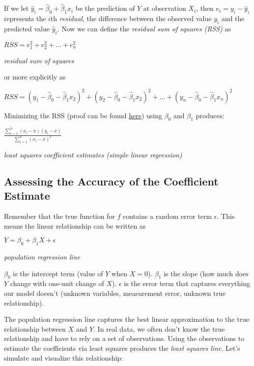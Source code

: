\documentclass[]{book}
\theoremstyle{definition}
\theoremstyle{definition}
\theoremstyle{definition}
\theoremstyle{remark}
\begin{document}
If we let \(\hat y_i = \hat\beta_0 + \hat\beta_1x_i\) be the prediction
of \(Y\) at observation \(X_i\), then \(e_i = y_i - \hat y_i\)
represents the \(i\)th \emph{residual}, the difference between the
observed value \(y_i\) and the predicted value \(\hat y_i\). Now we can
define the \emph{residual sum of squares (RSS)} as

\(RSS = e_1^2 + e_2^2 + ... + e_n^2\)

\emph{residual sum of squares}

or more explicitly as

\(RSS = (y_1 - \hat\beta_0 - \hat\beta_1x_2)^2 + (y_2 - \hat\beta_0 - \hat\beta_1x_2)^2 + ... + (y_n - \hat\beta_0 - \hat\beta_1x_n)^2\)

Minimizing the RSS (proof can be found
\href{https://en.m.wikipedia.org/wiki/Simple_linear_regression\#Derivation_of_simple_regression_estimators}{here})
using \(\beta_0\) and \(\beta_1\) produces:

\(\frac{\displaystyle \sum_{i=1}^{n}(x_i-\bar x)(y_i - \bar x)}{\displaystyle\sum_{i=1}^{n}(x_i - \bar x)^2}\)

\emph{least squares coefficient estimates (simple linear regression)}

\subsection{Assessing the Accuracy of the Coefficient
Estimate}\label{assessing-the-accuracy-of-the-coefficient-estimate}

Remember that the true function for \(f\) contains a random error term
\(\epsilon\). This means the linear relationship can be written as

\(Y = \beta_0 + \beta_1X + \epsilon\)

\emph{population regression line}

\(\beta_0\) is the intercept term (value of \(Y\) when \(X = 0\)).
\(\beta_1\) is the slope (how much does \(Y\) change with one-unit
change of \(X\)). \(\epsilon\) is the error term that captures
everything our model doesn't (unknown variables, measurement error,
unknown true relationship).

The population regression line captures the best linear approximation to
the true relationship between \(X\) and \(Y\). In real data, we often
don't know the true relationship and have to rely on a set of
observations. Using the observations to estimate the coefficients via
least squares produces the \emph{least squares line}. Let's simulate and
visualize this relationship:
\end{document}

